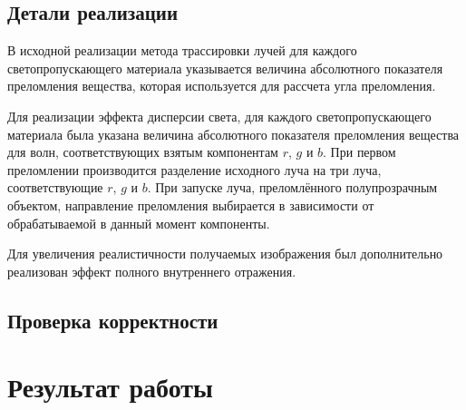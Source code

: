 \documentclass[a4paper,10pt]{article}
\begin{document}
\subsection{Детали реализации}
В исходной реализации метода трассировки лучей для каждого светопропускающего материала указывается 
величина абсолютного показателя преломления вещества, которая используется для рассчета угла преломления.

Для реализации эффекта дисперсии света, 
для каждого светопропускающего материала была указана величина абсолютного показателя преломления вещества для волн,
соответствующих взятым компонентам $r$, $g$ и $b$.
При первом преломлении производится разделение исходного луча на три луча, соответствующие $r$, $g$ и $b$.
При запуске луча, преломлённого полупрозрачным объектом, 
направление преломления выбирается в зависимости от обрабатываемой в данный момент компоненты.

Для увеличения реалистичности получаемых изображения был дополнительно реализован 
эффект полного внутреннего отражения.

\subsection{Проверка корректности}

\section{Результат работы}



\end{document}
